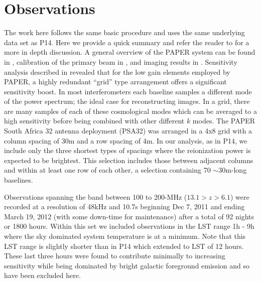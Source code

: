 \documentclass[preprint]{aastex}
\begin{document}
%



\section{Observations}
\label{sec:observations}
The work here follows the same basic procedure and uses the same underlying data set as P14. Here we provide a quick summary and refer the reader to \cite{Parsons:2013p9876} for a more in depth discussion.  A general overview of the PAPER system can be found in \cite{Parsons:2010p6757}, calibration of the primary beam in \cite{Pober:2012p8800}, and imaging results in \cite{Jacobs:2011p8438,Jacobs:2013p10014,Stefan:2013p9926}.  Sensitivity analysis described in \cite{Parsons:2012p9028} revealed that for the low gain elements employed by PAPER, a highly redundant ``grid'' type arrangement offers a significant sensitivity boost.  In most interferometers each baseline samples a different mode of the power spectrum; the ideal case for reconstructing images.  In a grid, there are many samples of each of these cosmological modes which can be averaged to a high sensitivity before being combined with other different $k$ modes.  The PAPER South Africa 32 antenna deployment (PSA32) was arranged in a 4x8 grid with a column spacing of 30m and a row spacing of 4m.  In our analysis, as in P14, we include only the three shortest types of spacings where the reionization power is expected to be brightest. This selection includes those between adjacent columns and within at least one row of each other, a selection containing 70 $\sim$30m-long baselines.

Observations spanning the band between 100 to 200-MHz ($13.1>z>6.1$) were recorded at a resolution of 48kHz and 10.7s  beginning Dec 7, 2011 and ending March 19, 2012 (with some down-time for maintenance) after a total of 92 nights or 1800 hours.  Within this set we included observations in the LST range 1h - 9h where the sky dominated system temperature is at a minimum.  Note that this LST range is slightly shorter than in P14 which extended to LST of 12 hours. These last three hours were found to contribute minimally to increasing sensitivity while being dominated by bright galactic foreground emission and so have been excluded here.
\end{document}
